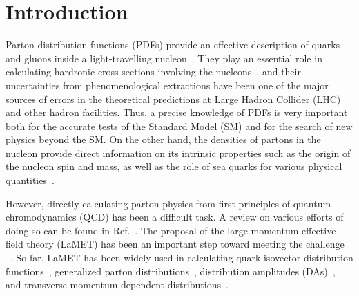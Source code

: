 \section{Introduction}\label{sec:intro}
Parton distribution functions (PDFs) provide an effective description of quarks and gluons inside a light-travelling nucleon~\cite{Ellis:1991qj,Thomas:2001kw}.
They play an essential role in calculating hardronic cross sections involving the nucleons~\cite{Gao:2017yyd}, and their uncertainties from phenomenological extractions have been one of the major
sources of errors in the theoretical predictions at Large Hadron Collider (LHC) and other hadron facilities. Thus, a precise knowledge of PDFs is very important both for the accurate tests of the Standard Model (SM) and for the search of new physics beyond the SM. On the other hand, the densities of partons in the nucleon provide direct information on its intrinsic properties such as the origin of the nucleon spin and mass, as well as the role of sea quarks for various physical quantities~\cite{Accardi:2012qut}. 
  
However, directly calculating parton physics from first principles of quantum chromodynamics (QCD) has been a difficult task. A review on various efforts of doing so can be found in Ref.~\cite{Cichy:2018mum}. The proposal of the large-momentum effective field theory (LaMET) has been an important step toward meeting the challenge ~\cite{Ji:2013dva,Ji:2014hxa,Ji:2020ect}. So far, LaMET has been widely used in calculating quark isovector distribution functions~\cite{Lin:2014zya,Alexandrou:2015rja,Chen:2016utp,Alexandrou:2016jqi,Alexandrou:2018pbm,Chen:2018xof,Lin:2018pvv,Liu:2018uuj,Alexandrou:2018eet,Liu:2018hxv,Chen:2018fwa,Izubuchi:2019lyk,Shugert:2020tgq,Chai:2020nxw,Lin:2020ssv,Fan:2020nzz}, generalized parton
distributions~\cite{Chen:2019lcm,Alexandrou:2019dax}, distribution amplitudes (DAs)~\cite{Zhang:2017bzy,Chen:2017gck,Zhang:2020gaj}, and transverse-momentum-dependent distributions~\cite{Shanahan:2019zcq,Shanahan:2020zxr,Zhang:2020dbb}. 

